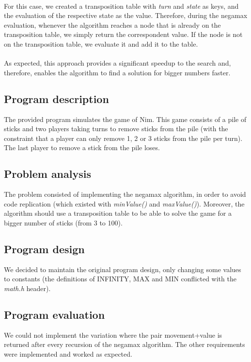 \documentclass{article}
\begin{document}
\paragraph{}For this case, we created a transposition table with \textit{turn} and \textit{state} as keys, and the evaluation of the respective state as the value. Therefore, during the negamax evaluation, whenever the algorithm reaches a node that is already on the transposition table, we simply return the correspondent value. If the node is not on the transposition table, we evaluate it and add it to the table.

\paragraph{} As expected, this approach provides a significant speedup to the search and, therefore, enables the algorithm to find a solution for bigger numbers faster.

\subsection*{Program description}
The provided program simulates the game of Nim. This game consists of a pile of sticks and two players taking turns to remove sticks from the pile (with the constraint that a player can only remove 1, 2 or 3 sticks from the pile per turn). The last player to remove a stick from the pile loses.

\subsection*{Problem analysis}
The problem consisted of implementing the negamax algorithm, in order to avoid code replication (which existed with \textit{minValue()} and \textit{maxValue()}). Moreover, the algorithm should use a transposition table to be able to solve the game for a bigger number of sticks (from 3 to 100).

\subsection*{Program design}
We decided to maintain the original program design, only changing some values to constants (the definitions of INFINITY, MAX and MIN conflicted with the \textit{math.h} header). 

\subsection*{Program evaluation}
We could not implement the variation where the pair movement+value is returned after every recursion of the negamax algorithm. The other requirements were implemented and worked as expected.
\end{document}

